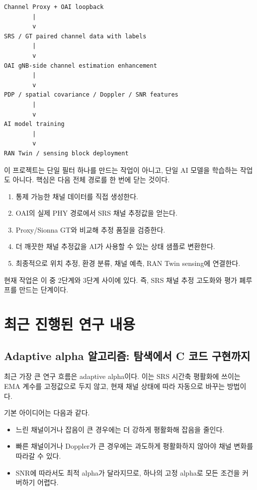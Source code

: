 \documentclass[11pt,a4paper]{article}
\begin{document}
\begin{lstlisting}
Channel Proxy + OAI loopback
        |
        v
SRS / GT paired channel data with labels
        |
        v
OAI gNB-side channel estimation enhancement
        |
        v
PDP / spatial covariance / Doppler / SNR features
        |
        v
AI model training
        |
        v
RAN Twin / sensing block deployment
\end{lstlisting}

이 프로젝트는 단일 필터 하나를 만드는 작업이 아니고, 단일 AI 모델을 학습하는 작업도 아니다. 핵심은 다음 전체 경로를 한 번에 닫는 것이다.

\begin{enumerate}
  \item 통제 가능한 채널 데이터를 직접 생성한다.
  \item OAI의 실제 PHY 경로에서 SRS 채널 추정값을 얻는다.
  \item Proxy/Sionna GT와 비교해 추정 품질을 검증한다.
  \item 더 깨끗한 채널 추정값을 AI가 사용할 수 있는 상태 샘플로 변환한다.
  \item 최종적으로 위치 추정, 환경 분류, 채널 예측, RAN Twin sensing에 연결한다.
\end{enumerate}

현재 작업은 이 중 2단계와 3단계 사이에 있다. 즉, SRS 채널 추정 고도화와 평가 폐루프를 만드는 단계이다.

\section{최근 진행된 연구 내용}

\subsection{Adaptive alpha 알고리즘: 탐색에서 C 코드 구현까지}

최근 가장 큰 연구 흐름은 adaptive alpha이다. 이는 SRS 시간축 평활화에 쓰이는 EMA 계수를 고정값으로 두지 않고, 현재 채널 상태에 따라 자동으로 바꾸는 방법이다.

기본 아이디어는 다음과 같다.

\begin{itemize}
  \item 느린 채널이거나 잡음이 큰 경우에는 더 강하게 평활화해 잡음을 줄인다.
  \item 빠른 채널이거나 Doppler가 큰 경우에는 과도하게 평활화하지 않아야 채널 변화를 따라갈 수 있다.
  \item SNR에 따라서도 최적 alpha가 달라지므로, 하나의 고정 alpha로 모든 조건을 커버하기 어렵다.
\end{itemize}
\end{document}
